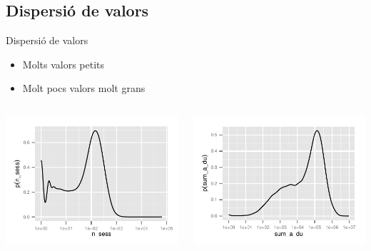 \documentclass[xcolor=x11names,
								compress,
								aspectratio=1610]{beamer}
\theoremstyle{definition}%
\renewcommand{\(}{\begin{columns}}
\renewcommand{\)}{\end{columns}}
\newcommand{\<}[1]{\begin{column}{#1}}
\renewcommand{\>}{\end{column}}
\begin{document}
	\subsection{Dispersió de valors}
	\begin{frame}{Dispersió de valors}
	\begin{itemize}
		\item Molts valors petits
		\item Molt pocs valors molt grans
	\end{itemize}
	\begin{columns}[onlytextwidth]
		\begin{column}{.5\textwidth}
		\includegraphics[width = \textwidth]{user_n_sessions_density_line_log}
		\end{column}
		\begin{column}{.5\textwidth}
		\includegraphics[width = \textwidth]{user_sum_activity_duration_density_line_log}
		\end{column}
	\end{columns}
	\end{frame}
	
\end{document}
